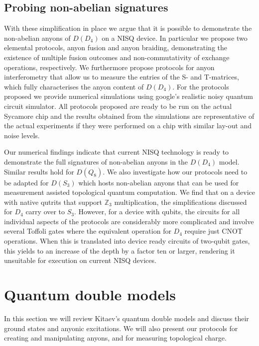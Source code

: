 \documentclass[two column]{article}
\begin{document}
\subsection{Probing non-abelian signatures}
With these simplification in place we argue that it is possible to demonstrate the non-abelian anyons of $D(D_4)$ on a NISQ device. In particular we propose two elemental protocols, anyon fusion and anyon braiding, demonstrating the existence of multiple fusion outcomes and non-commutativity of exchange operations, respectively. We furthermore propose protocols for anyon interferometry that allow us to measure the entries of the S- and T-matrices, which fully characterises the anyon content of $D(D_4)$. For the protocols proposed we provide numerical simulations using google's realistic noisy quantum circuit simulator. All protocols proposed are ready to be run on the actual Sycamore chip and the results obtained from the simulations are representative of the actual experiments if they were performed on a chip with similar lay-out and noise levels. 

Our numerical findings indicate that current NISQ technology is ready to demonstrate the full signatures of non-abelian anyons in the $D(D_4)$ model. Similar results hold for $D(Q_8)$. We also investigate how our protocols need to be adapted for $D(S_3)$ which hosts non-abelian anyons that can be used for measurement assisted topological quantum computation. We find that on a device with native qutrits that support $\mathbb Z_3$ multiplication, the simplifications discussed for $D_4$ carry over to $S_3$. However, for a device with qubits, the circuits for all individual aspects of the protocols are considerably more complicated and involve several Toffoli gates where the equivalent operation for $D_4$ require just CNOT operations. When this is translated into device ready circuits of two-qubit gates, this yields to an increase of the depth by a factor ten or larger, rendering it unsuitable for execution on current NISQ devices.


\section{Quantum double models}\label{sec:qm_double}

In this section we will review Kitaev's quantum double models\cite{Kitaev_2003} and discuss their ground states and anyonic excitations. We will also present our protocols for creating and manipulating anyons, and for measuring topological charge. 
\end{document}
